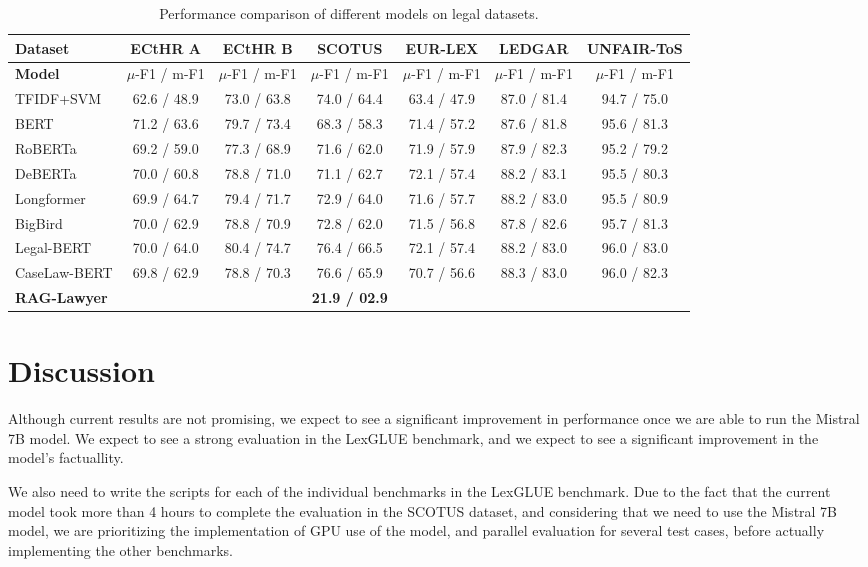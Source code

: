 \documentclass[11pt]{article}
\begin{document}
\begin{table*}[t]
\centering
\begin{tabular}{l|c|c|c|c|c|c}
\hline
\textbf{Dataset} & \textbf{ECtHR A} & \textbf{ECtHR B} & \textbf{SCOTUS} & \textbf{EUR-LEX} & \textbf{LEDGAR} & \textbf{UNFAIR-ToS} \\
\hline
\textbf{Model} & \(\mu\)-F1 / m-F1 & \(\mu\)-F1 / m-F1 & \(\mu\)-F1 / m-F1 & \(\mu\)-F1 / m-F1 & \(\mu\)-F1 / m-F1 & \(\mu\)-F1 / m-F1 \\
\hline
TFIDF+SVM & 62.6 / 48.9 & 73.0 / 63.8 & 74.0 / 64.4 & 63.4 / 47.9 & 87.0 / 81.4 & 94.7 / 75.0 \\
BERT & 71.2 / 63.6 & 79.7 / 73.4 & 68.3 / 58.3 & 71.4 / 57.2 & 87.6 / 81.8 & 95.6 / 81.3 \\
RoBERTa & 69.2 / 59.0 & 77.3 / 68.9 & 71.6 / 62.0 & 71.9 / 57.9 & 87.9 / 82.3 & 95.2 / 79.2 \\
DeBERTa & 70.0 / 60.8 & 78.8 / 71.0 & 71.1 / 62.7 & 72.1 / 57.4 & 88.2 / 83.1 & 95.5 / 80.3 \\
Longformer & 69.9 / 64.7 & 79.4 / 71.7 & 72.9 / 64.0 & 71.6 / 57.7 & 88.2 / 83.0 & 95.5 / 80.9 \\
BigBird & 70.0 / 62.9 & 78.8 / 70.9 & 72.8 / 62.0 & 71.5 / 56.8 & 87.8 / 82.6 & 95.7 / 81.3 \\
Legal-BERT & 70.0 / 64.0 & 80.4 / 74.7 & 76.4 / 66.5 & 72.1 / 57.4 & 88.2 / 83.0 & 96.0 / 83.0 \\
CaseLaw-BERT & 69.8 / 62.9 & 78.8 / 70.3 & 76.6 / 65.9 & 70.7 / 56.6 & 88.3 / 83.0 & 96.0 / 82.3 \\
  \textbf{RAG-Lawyer} &  &  & \textbf{21.9 / 02.9}&  &  &  \\
\hline
\end{tabular}
\caption{Performance comparison of different models on legal datasets.}
\end{table*}

\section{Discussion}
Although current results are not promising, we expect to see a significant improvement in performance once we are able to run the Mistral 7B model. We expect to see a strong evaluation in the LexGLUE benchmark, and we expect to see a significant improvement in the model's factuallity.

We also need to write the scripts for each of the individual benchmarks in the LexGLUE benchmark. Due to the fact that the current model took more than 4 hours to complete the evaluation in the SCOTUS dataset, and considering that we need to use the Mistral 7B model, we are prioritizing the implementation of GPU use of the model, and parallel evaluation for several test cases, before actually implementing the other benchmarks.
\end{document}
